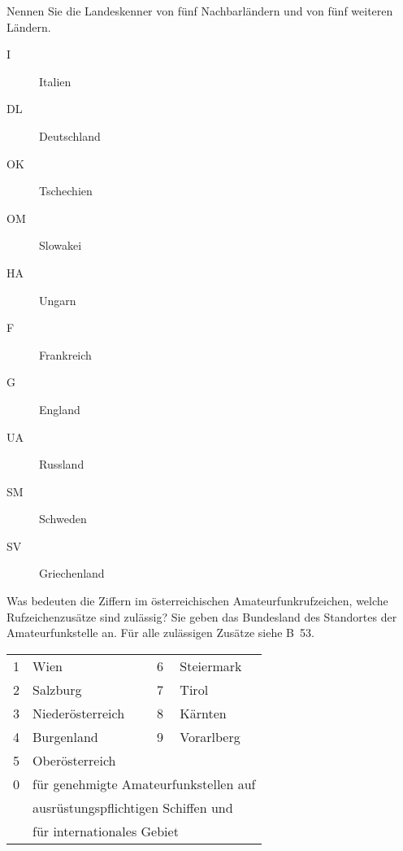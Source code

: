 \documentclass[avery5371,grid,frame,a4paper]{flashcards}
\newcommand{\card}[3]{
  \begin{flashcard}[{\chap} -- #1]{#2}#3\end{flashcard}
}
\begin{document}
\card{54}{Nennen Sie die Landeskenner von fünf Nachbarländern und von fünf weiteren Ländern.}{
  \begin{minipage}{0.48\textwidth}
    \begin{description}
      \item[I] Italien
      \item[DL] Deutschland
      \item[OK] Tschechien
      \item[OM] Slowakei
      \item[HA] Ungarn
    \end{description}
  \end{minipage}
  \begin{minipage}{0.5\textwidth}
    \begin{description}
      \item[F] Frankreich
      \item[G] England
      \item[UA] Russland
      \item[SM] Schweden
      \item[SV] Griechenland
    \end{description}
  \end{minipage}
}
\card{55}{Was bedeuten die Ziffern im österreichischen Amateurfunkrufzeichen, welche Rufzeichenzusätze sind zulässig?}{
  Sie geben das Bundesland des Standortes der Amateurfunkstelle an. Für alle zulässigen Zusätze siehe B~53.

  \begin{tabular}{llll}
    1 & Wien               & 6 & Steiermark \\
    2 & Salzburg           & 7 & Tirol \\
    3 & Niederösterreich   & 8 & Kärnten \\
    4 & Burgenland         & 9 & Vorarlberg \\
    5 & Oberösterreich     &   & \\
    0 & \multicolumn{3}{l}{für genehmigte Amateurfunkstellen auf} \\
      & \multicolumn{3}{l}{ausrüstungspflichtigen Schiffen und} \\
      & \multicolumn{3}{l}{für internationales Gebiet} \\
  \end{tabular}
}
\end{document}
